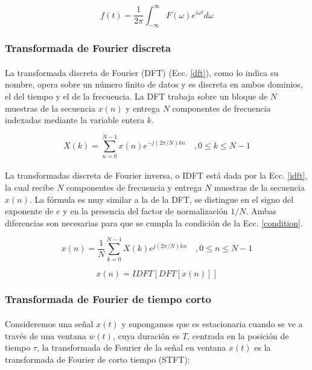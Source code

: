 \documentclass[12pt]{article}%
\begin{document}
\begin{equation}
f(t)=\frac{1}{2\pi}\int_{-\infty}^{\infty}F(\omega)e^{i{\omega}t}d\omega
\end{equation}

\subsubsection{Transformada de Fourier discreta}

\paragraph{}
La transformada discreta de Fourier (DFT) (Ecc. \ref{dft}), como lo indica su nombre, opera sobre un número finito de datos y es discreta en ambos dominios, el del tiempo y el de la frecuencia. La DFT trabaja sobre un bloque de $N$ muestras de la secuencia $x(n)$ y entrega $N$ componentes de frecuencia indexadas mediante la variable entera $k$.

\begin{equation}
\label{dft}
X(k) = \sum_{n=0}^{N-1}x(n)e^{-j(2\pi/N)kn} \quad , 0 \leq k \leq N-1
\end{equation}

\paragraph{}
La transformadas discreta de Fourier inversa, o IDFT está dada por la Ecc. \ref{idft}, la cual recibe $N$ componentes de frecuencia y entrega $N$ muestras de la secuencia $x(n)$. La fórmula es muy similar a la de la DFT, se distingue en el signo del exponente de $e$ y en la presencia del factor de normalización $1/N$. Ambas diferencias son necesarias para que se cumpla la condición de la Ecc. \ref{condition}.

\begin{equation}
\label{idft}
x(n)=\frac{1}{N}\sum_{k=0}^{N-1}X(k)e^{j(2\pi/N)kn} \quad ,0 \leq n \leq N-1
\end{equation}

\begin{equation}
\label{condition}
x(n) = IDFT[DFT[x(n)]]
\end{equation}

\subsubsection{Transformada de Fourier de tiempo corto}
\paragraph{}
Consideremos una señal $x(t)$ y supongamos que es estacionaria cuando se ve a través de una ventana $w(t)$, cuya duración es $T$, centrada en la posición de tiempo $\tau$, la transformada de Fourier de la señal en ventana $x(t)$ es la transformada de Fourier de corto tiempo \cite{yufeng} (STFT):
\end{document}
